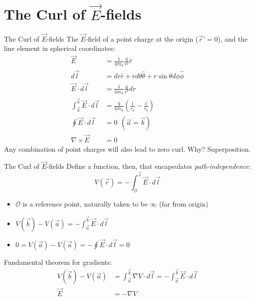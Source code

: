 \documentclass{beamer}
\begin{document}
\section{The Curl of $\vec{E}$-fields}

\begin{frame}{The Curl of $\vec{E}$-fields}
The $\vec{E}$-field of a point charge at the origin ($\vec{r}' = 0$), and the line element in spherical coordinates:
\begin{align}
\vec{E} &= \frac{1}{4\pi\epsilon_0} \frac{q}{r^2} \hat{r} \\
d\vec{l} &= dr\hat{r} + rd\theta \hat{\theta} + r\sin\theta d\phi \hat{\phi} \\
\vec{E} \cdot d\vec{l} &= \frac{1}{4\pi\epsilon_0} \frac{q}{r^2} dr \\
\int_{\vec{a}}^{\vec{b}} \vec{E} \cdot d\vec{l} &= \frac{q}{4\pi\epsilon_0} \left(\frac{1}{r_a} - \frac{1}{r_b} \right) \\
\oint \vec{E} \cdot d\vec{l} &=  0 ~~ (\vec{a} = \vec{b}) \\
\nabla \times \vec{E} &= 0
\end{align}
Any combination of point charges will also lead to zero curl.  Why?  Superposition.
\end{frame}

\begin{frame}{The Curl of $\vec{E}$-fields}
\small
Define a function, then, that encapsulates \textit{path-independence}:
\begin{equation}
V(\vec{r}) = -\int_{\mathcal{O}}^{\vec{r}} \vec{E} \cdot d\vec{l}
\end{equation}
\begin{itemize}
\item $\mathcal{O}$ is a reference point, naturally taken to be $\infty$ (far from origin)
\item $V(\vec{b}) - V(\vec{a}) = -\int_{\vec{a}}^{\vec{b}} \vec{E} \cdot d\vec{l}$
\item $0 = V(\vec{a}) - V(\vec{a}) = -\oint \vec{E} \cdot d\vec{l} = 0$
\end{itemize}
Fundamental theorem for gradients:
\begin{align}
V(\vec{b}) - V(\vec{a}) &= \int_{\vec{a}}^{\vec{b}} \nabla V \cdot d\vec{l} = -\int_{\vec{a}}^{\vec{b}} \vec{E} \cdot d\vec{l} \\
\vec{E} &= -\nabla V
\end{align}
\end{frame}
\end{document}
